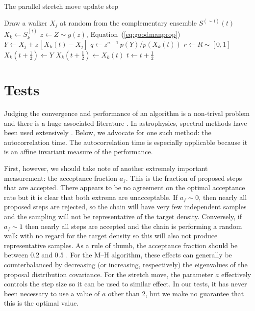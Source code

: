 \documentclass[12pt,preprint]{aastex}
\newcommand{\Eq}[1]{Equation~(\ref{eq:#1})}
\newcommand{\eq}[1]{\Eq{#1}}
\newcommand{\sectlabel}[1]{\label{sect:#1}}
\newcommand{\algolabel}[1]{\label{algo:#1}}
\newcommand{\ensemble}{S}
\newcommand{\colorens}[1]{\ensemble^{(#1)}}
\renewcommand{\vector}[1]{#1}
\newcommand{\af}{\ensuremath{a_f}}
\begin{document}
\begin{algorithm}
\caption{The parallel stretch move update step
    \algolabel{parallel}}
\begin{algorithmic}[1]
     \label{line:parallelloop}
        \STATE Draw a walker $\vector{X_j}$ at random from the complementary %
            ensemble $\colorens{\sim i} (t)$
        \STATE $\vector{X_k} \gets \colorens{i}_k$
        \STATE $z \gets Z \sim g(z)$, \Eq{goodmanprop}
        \STATE $\vector{Y} \gets \vector{X_j}
                + z \, [ \vector{X_k} (t) - \vector{X_j}]$
        \STATE $q \gets z^{n-1} \, p(\vector{Y})/p(\vector{X}_k(t))$
        \STATE $r \gets R \sim [0, 1]$
        \IF{$r \le q$, \eq{acceptance}}
            \STATE $\vector{X_k} (t+\frac{1}{2}) \gets \vector{Y}$
        \ELSE
            \STATE $\vector{X_k} (t+\frac{1}{2}) \gets \vector{X_k}(t)$
        \ENDIF
    \ENDFOR
    \STATE $t \gets t+\frac{1}{2}$
\ENDFOR

\end{algorithmic}
\end{algorithm}

\section{Tests} \sectlabel{tests}

Judging the convergence and performance of an algorithm is a
non-trival problem and there is a huge associated literature
\citep[see, for example,][for a review]{Cowles:1996}. In astrophysics,
spectral methods have been used extensively \citep[for
example][]{Dunkley:2005}. Below, we advocate for one such method: the
autocorrelation time. The autocorrelation time is especially applicable
because it is an affine invariant measure of the performance.

First,
however, we should take note of another extremely important measurement:
the acceptance fraction \af. This is the fraction of proposed steps that are
accepted. There appears to be no agreement on the optimal acceptance rate
but it is clear that both extrema are unacceptable. If $\af \sim 0$, then
nearly all proposed steps are rejected, so
the chain will have very few independent samples and the sampling will not be
representative of the target density. Conversely, if $\af \sim 1$ then nearly
all steps are accepted and the
chain is performing a random walk with no regard for the target density so
this will also not produce representative samples. As a rule of thumb, the
acceptance fraction should be between $0.2$ and $0.5$
\citep[for example,][]{Gelman:1996}. For the M--H algorithm,
these effects can generally be counterbalanced by decreasing (or increasing,
respectively) the eigenvalues of the proposal distribution covariance. For
the stretch move, the parameter $a$ effectively controls the step size so
it can be used to similar effect. In our tests, it has never been
necessary to use a value of $a$ other than $2$, but we make no guarantee that
this is the optimal value.
\end{document}
